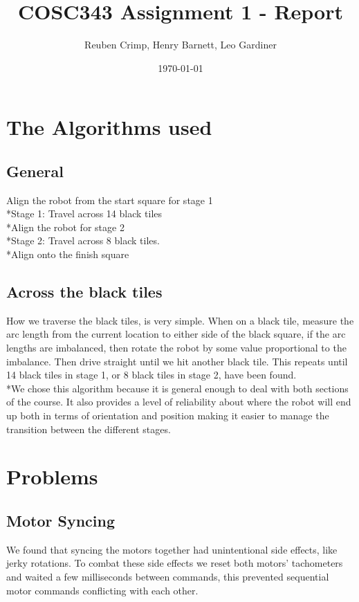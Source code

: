 \documentclass[a4paper,11pt]{article}
\title{COSC343 Assignment 1 - Report}
\author{Reuben Crimp, Henry Barnett, Leo Gardiner}
\date{\today}
\begin{document}
\maketitle
\section {The Algorithms used}

\subsection{General}
Align the robot from the start square for stage 1
\\*Stage 1: Travel across 14 black tiles
\\*Align the robot for stage 2
\\*Stage 2: Travel across 8 black tiles.
\\*Align onto the finish square

\subsection{Across the black tiles}
How we traverse the black tiles, is very simple.
When on a black tile, measure the arc length from the current location to either side of the black square, if the arc lengths are imbalanced, then rotate the robot by some value proportional to the imbalance. Then drive straight until we hit another black tile. This repeats until 14 black tiles in stage 1, or 8 black tiles in stage 2, have been found.
\\*We chose this algorithm because it is general enough to deal with both sections of the course. It also provides a level of reliability about where the robot will end up both in terms of orientation and position making it easier to manage the transition between the different stages.

\section {Problems}

\subsection{Motor Syncing}
We found that syncing the motors together had unintentional side effects, like jerky rotations. To combat these side effects we reset both motors' tachometers and waited a few milliseconds between commands, this prevented sequential motor commands conflicting with each other.
\end{document}
